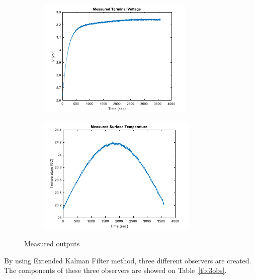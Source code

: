 \documentclass[12pt]{article}
\begin{document}
\begin{figure}[H]
	\centering
	\begin{subfigure}[t]{0.45\linewidth}
		\includegraphics[width=\linewidth]{figures/measureOut1.pdf}
	\end{subfigure}
	\begin{subfigure}[t]{0.45\linewidth}
		\includegraphics[width=\linewidth]{figures/measureOut2.pdf}
	\end{subfigure}	
	\caption{Measured outputs}\label{fig:measureOut}
\end{figure}
By using Extended Kalman Filter method, three different observers are created. The components of these three observers are showed on Table~\ref{tb:3obs}.
\end{document}
